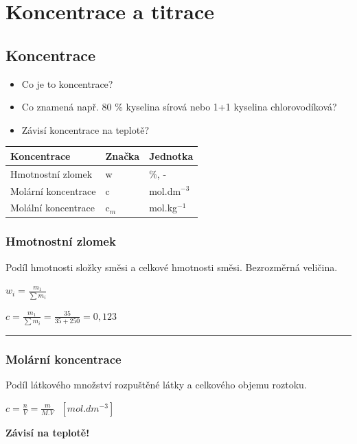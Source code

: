 \section{Koncentrace a titrace}

\subsection{Koncentrace}

\begin{itemize}
	\item Co je to koncentrace?
	\item Co znamená např. 80 \% kyselina sírová nebo 1+1 kyselina chlorovodíková?
	\item Závisí koncentrace na teplotě?
\end{itemize}

\begin{tabular}{|l|l|l|}
	\hline
	\textbf{Koncentrace} & \textbf{Značka} & \textbf{Jednotka} \\\hline
	Hmotnostní zlomek & w & \%, - \\\hline
	Molární koncentrace & c & mol.dm$^{-3}$ \\\hline
	Molální koncentrace & c$_m$ & mol.kg$^{-1}$ \\\hline
\end{tabular}

\subsubsection{Hmotnostní zlomek}

Podíl hmotnosti složky směsi a celkové hmotnosti směsi. Bezrozměrná veličina.

$w_i = \frac{m_1}{\sum m_i}$


$c = \frac{m_1}{\sum m_i} = \frac{35}{35 + 250} = 0,123$
\hrule

\subsubsection{Molární koncentrace}

Podíl látkového množství rozpuštěné látky a celkového objemu roztoku.

$c = \frac{n}{V} = \frac{m}{M . V}\ \ \ [mol.dm^{-3}]$

\textbf{Závisí na teplotě!}

